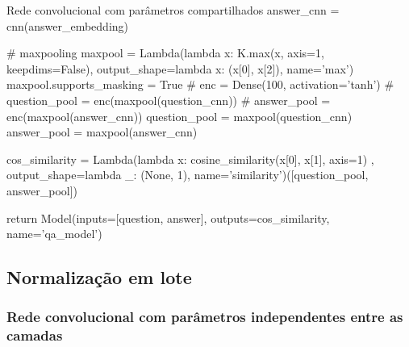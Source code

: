 \begin{mypython-linenumber}{Rede convolucional com parâmetros compartilhados}
            answer_cnn = cnn(answer_embedding)

        # maxpooling
        maxpool = Lambda(lambda x: K.max(x, axis=1, keepdims=False), output_shape=lambda x: (x[0], x[2]),
                         name='max')
        maxpool.supports_masking = True
        # enc = Dense(100, activation='tanh')
        # question_pool = enc(maxpool(question_cnn))
        # answer_pool = enc(maxpool(answer_cnn))
        question_pool = maxpool(question_cnn)
        answer_pool = maxpool(answer_cnn)

        cos_similarity = Lambda(lambda x: cosine_similarity(x[0], x[1], axis=1)
                                       , output_shape=lambda _: (None, 1), name='similarity')([question_pool,
                                                                                               answer_pool])
        

        return Model(inputs=[question, answer], outputs=cos_similarity,
                                   name='qa_model')
\end{mypython-linenumber}

\subsection{Normalização em lote}

\subsubsection{Rede convolucional com parâmetros independentes entre as camadas}

